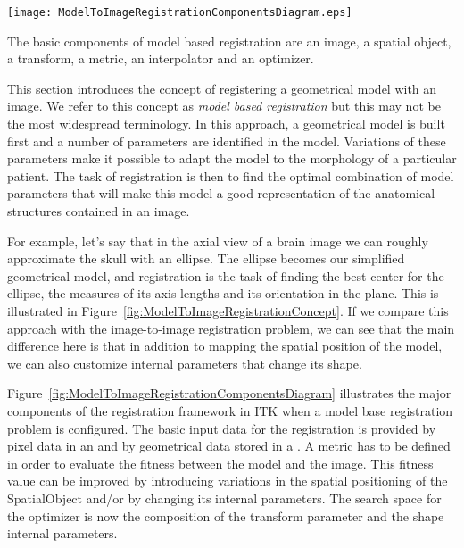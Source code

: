%
%
%
%
%
%

\begin{floatingfigure}[rlp]{8cm}
  \centering
  \texttt{[image: ModelToImageRegistrationComponentsDiagram.eps]}
  \caption[Model to Image Registration Framework Components]{The basic
components of model based registration are an image, a spatial object, a
transform, a metric, an interpolator and an
optimizer.\label{fig:ModelToImageRegistrationComponentsDiagram}}
\end{floatingfigure}

This section introduces the concept of registering a geometrical model with
an image. We refer to this concept as \emph{model based registration} but
this may not be the most widespread terminology. In this approach, a
geometrical model is built first and a number of parameters are identified in
the model. Variations of these parameters make it possible to adapt the model
to the morphology of a particular patient. The task of registration
is then to find the optimal combination of model parameters that will
make this model a good representation of the anatomical structures
contained in an image.

For example, let's say that in the axial view of a brain image we can roughly
approximate the skull with an ellipse. The ellipse becomes our simplified
geometrical model, and registration is the task of finding the best center for
the ellipse, the measures of its axis lengths and its orientation in the plane.
This is illustrated in Figure~\ref{fig:ModelToImageRegistrationConcept}.  If we
compare this approach with the image-to-image registration problem, we can see
that the main difference here is that in addition to mapping the spatial
position of the model, we can also customize internal parameters that change
its shape.

Figure~\ref{fig:ModelToImageRegistrationComponentsDiagram}   illustrates  the
major  components of  the registration  framework in  ITK when  a  model base
registration problem is configured. The basic input data for the registration
is  provided by  pixel data  in an   and  by  geometrical data
stored in a  . A metric has to be  defined in order to
evaluate the fitness between the model  and the image. This fitness value can
be  improved by  introducing variations  in  the spatial  positioning of  the
SpatialObject and/or  by changing its  internal parameters. The  search space
for the optimizer  is now the composition of the  transform parameter and the
shape internal parameters.

